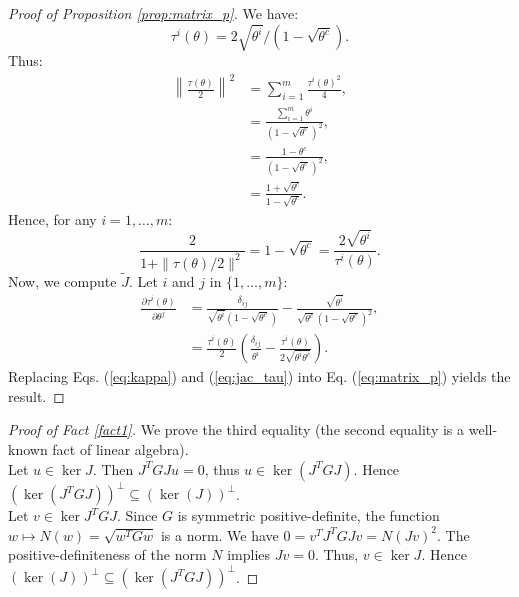 \documentclass[entropy,article,submit,pdftex,moreauthors]{Definitions/mdpi}
\theoremstyle{plain}
\theoremstyle{definition}
\begin{document}
\begin{proof}[Proof of Proposition \ref{prop:matrix_p}]
    We have:
    \begin{equation*}
        \tau^i(\theta) = 2\sqrt{\theta^i}/\left(1-\sqrt{\theta^c}\right).    
    \end{equation*}
    Thus:
    \begin{align*}
        \left\|\frac{\tau(\theta)}{2}\right\|^2 &= \sum_{i=1}^m \frac{\tau^i(\theta)^2}{4}, \\
        &= \frac{\sum_{i=1}^m \theta^i}{\left(1- \sqrt{\theta^c}\right)^2}, \\
        &= \frac{1 - \theta^c}{\left(1- \sqrt{\theta^c}\right)^2}, \\
        &= \frac{1+\sqrt{\theta^c}}{1-\sqrt{\theta^c}}.  
    \end{align*}
    Hence, for any $i = 1, \dots, m$:
    \begin{equation}
    \label{eq:kappa}
        \frac{2}{1+\|\tau(\theta)/2\|^2} = 1 - \sqrt{\theta^c} = \frac{2\sqrt{\theta^i}}{\tau^i(\theta)}.
    \end{equation}
    Now, we compute $\widetilde{J}$. Let $i$ and $j$ in $\{1, \dots, m\}$:
    \begin{align}
        \frac{\partial \tau^i(\theta)}{\partial \theta^j} &= \frac{\delta_{ij}}{\sqrt{\theta^i}\left(1-\sqrt{\theta^c}\right)} - \frac{\sqrt{\theta^i}}{\sqrt{\theta^c}\left(1-\sqrt{\theta^c}\right)^2}, \\
        \label{eq:jac_tau}
        &= \frac{\tau^i(\theta)}{2}\left(\frac{\delta_{ij}}{\theta^i} - \frac{\tau^i(\theta)}{2\sqrt{\theta^i \theta^c}}\right).
    \end{align}
    Replacing Eqs. (\ref{eq:kappa}) and (\ref{eq:jac_tau}) into Eq. (\ref{eq:matrix_p}) yields the result.
\end{proof}

\begin{proof}[Proof of Fact \ref{fact1}]
    We prove the third equality (the second equality is a well-known fact of linear algebra). \\
    Let $u \in \ker J$. Then $J^T G J u = 0$, thus $u \in \ker(J^T G J)$. Hence $\left(\ker(J^T G J)\right)^\perp \subseteq \left(\ker(J)\right)^\perp$. \\
    Let $v \in \ker J^T G J$. Since $G$ is symmetric positive-definite, the function $w \mapsto N(w) = \sqrt{w^TGw}$ is a norm. We have $0 = v^T J^T G J v= N(J v)^2$. The positive-definiteness of the norm $N$ implies $J v = 0$. Thus, $v \in \ker J$. Hence $\left(\ker(J)\right)^\perp \subseteq \left(\ker(J^T G J)\right)^\perp  $.
\end{proof}
\end{document}
